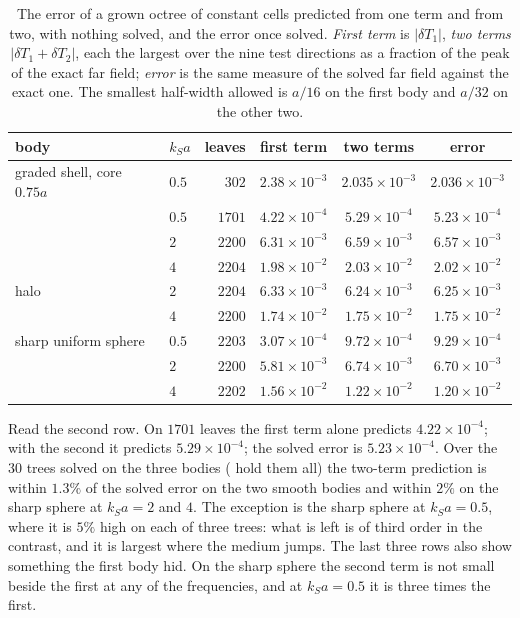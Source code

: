 \documentclass[11pt,a4paper]{article}
\begin{document}
\begin{table}[htbp]
\centering
\caption{The error of a grown octree of constant cells predicted from one term and from two, with nothing
solved, and the error once solved. \emph{First term} is $|\delta T_1|$, \emph{two terms}
$|\delta T_1+\delta T_2|$, each the largest over the nine test directions as a fraction of the peak of the
exact far field; \emph{error} is the same measure of the solved far field against the exact one. The
smallest half-width allowed is $a/16$ on the first body and $a/32$ on the other two.}\label{tab:greedytwo}
\small
\begin{tabular}{@{}llrccc@{}}
\toprule
body & $k_Sa$ & leaves & first term & two terms & error \\
\midrule
graded shell, core $0.75a$ & $0.5$ & $302$  & $2.38\times10^{-3}$ & $2.035\times10^{-3}$ & $2.036\times10^{-3}$ \\
                           & $0.5$ & $1701$ & $4.22\times10^{-4}$ & $5.29\times10^{-4}$ & $5.23\times10^{-4}$ \\
                           & $2$   & $2200$ & $6.31\times10^{-3}$ & $6.59\times10^{-3}$ & $6.57\times10^{-3}$ \\
                           & $4$   & $2204$ & $1.98\times10^{-2}$ & $2.03\times10^{-2}$ & $2.02\times10^{-2}$ \\
\midrule
halo                       & $2$   & $2204$ & $6.33\times10^{-3}$ & $6.24\times10^{-3}$ & $6.25\times10^{-3}$ \\
                           & $4$   & $2200$ & $1.74\times10^{-2}$ & $1.75\times10^{-2}$ & $1.75\times10^{-2}$ \\
\midrule
sharp uniform sphere       & $0.5$ & $2203$ & $3.07\times10^{-4}$ & $9.72\times10^{-4}$ & $9.29\times10^{-4}$ \\
                           & $2$   & $2200$ & $5.81\times10^{-3}$ & $6.74\times10^{-3}$ & $6.70\times10^{-3}$ \\
                           & $4$   & $2202$ & $1.56\times10^{-2}$ & $1.22\times10^{-2}$ & $1.20\times10^{-2}$ \\
\bottomrule
\end{tabular}
\end{table}

Read the second row. On $1701$ leaves the first term alone predicts $4.22\times10^{-4}$; with the second
it predicts $5.29\times10^{-4}$; the solved error is $5.23\times10^{-4}$. Over the $30$ trees solved on
the three bodies ( hold them all) the two-term
prediction is within $1.3\%$ of the solved error on the two smooth bodies and within $2\%$ on the sharp
sphere at $k_Sa=2$ and $4$. The exception is the sharp sphere at $k_Sa=0.5$, where it is $5\%$ high on
each of three trees: what is left is of third order in the contrast, and it is largest where the medium
jumps. The last three rows also show something the first body hid. On the sharp sphere the second term
is not small beside the first at any of the frequencies, and at $k_Sa=0.5$ it is three times the first.
\end{document}
